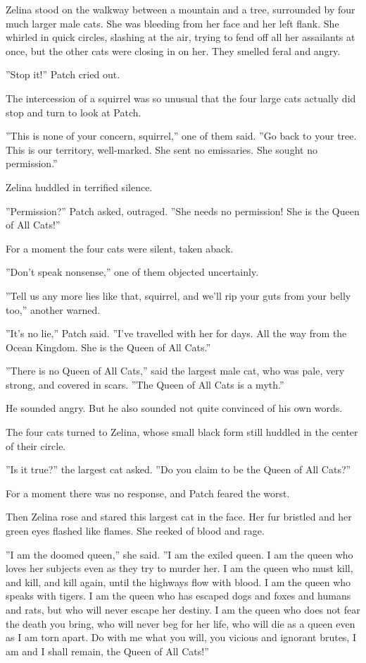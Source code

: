 \documentclass[12pt]{book}
\begin{document}
 Zelina stood on the walkway between a mountain and a tree, surrounded by four much larger male cats. She was bleeding from her face and her left flank. She whirled in quick circles, slashing at the air, trying to fend off all her assailants at once, but the other cats were closing in on her. They smelled feral and angry.\par
 ''Stop it!'' Patch cried out.\par
 The intercession of a squirrel was so unusual that the four large cats actually did stop and turn to look at Patch.\par
 ''This is none of your concern, squirrel,'' one of them said. ''Go back to your tree. This is our territory, well-marked. She sent no emissaries. She sought no permission.''\par
 Zelina huddled in terrified silence.\par
 ''Permission?'' Patch asked, outraged. ''She needs no permission! She is the Queen of All Cats!''\par
 For a moment the four cats were silent, taken aback.\par
 ''Don't speak nonsense,'' one of them objected uncertainly.\par
''Tell us any more lies like that, squirrel, and we'll rip your guts from your belly too,'' another warned.\par
 ''It's no lie,'' Patch said. ''I've travelled with her for days. All the way from the Ocean Kingdom. She is the Queen of All Cats.''\par
''There is no Queen of All Cats,'' said the largest male cat, who was pale, very strong, and covered in scars. ''The Queen of All Cats is a myth.''\par
He sounded angry. But he also sounded not quite convinced of his own words.\par
The four cats turned to Zelina, whose small black form still huddled in the center of their circle.\par
 ''Is it true?'' the largest cat asked. ''Do you claim to be the Queen of All Cats?''\par
 For a moment there was no response, and Patch feared the worst.\par
Then Zelina rose and stared this largest cat in the face. Her fur bristled and her green eyes flashed like flames. She reeked of blood and rage.\par
 ''I am the doomed queen,'' she said. ''I am the exiled queen. I am the queen who loves her subjects even as they try to murder her. I am the queen who must kill, and kill, and kill again, until the highways flow with blood. I am the queen who speaks with tigers. I am the queen who has escaped dogs and foxes and humans and rats, but who will never escape her destiny. I am the queen who does not fear the death you bring, who will never beg for her life, who will die as a queen even as I am torn apart. Do with me what you will, you vicious and ignorant brutes, I am and I shall remain, the Queen of All Cats!''\par
\end{document}

